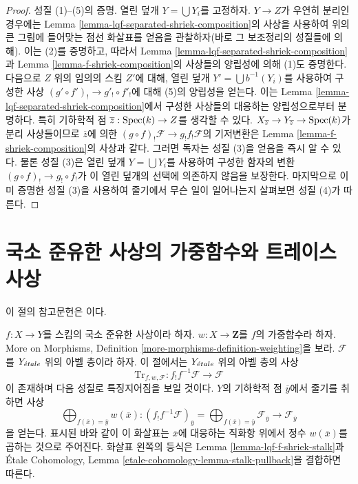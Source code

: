 \begin{proof}
\medskip\noindent
성질 (1)--(5)의 증명. 열린 덮개 $Y = \bigcup Y_i$를 고정하자.
$Y \to Z$가 우연히 분리인 경우에는 Lemma
\ref{lemma-lqf-separated-shriek-composition}의 사상을 사용하여 위의
큰 그림에 들어맞는 점선 화살표를 얻음을 관찰하자(바로 그 보조정리의
성질들에 의해). 이는 (2)를 증명하고, 따라서 Lemma
\ref{lemma-lqf-separated-shriek-composition}과 Lemma
\ref{lemma-f-shriek-composition}의 사상들의 양립성에 의해 (1)도
증명한다. 다음으로 $Z$ 위의 임의의 스킴 $Z'$에 대해, 열린 덮개
$Y' = \bigcup b^{-1}(Y_i)$를 사용하여 구성한 사상
$(g' \circ f')_! \to g'_! \circ f'_!$에 대해 (5)의 양립성을 얻는다.
이는 Lemma \ref{lemma-lqf-separated-shriek-composition}에서 구성한
사상들의 대응하는 양립성으로부터 분명하다. 특히 기하학적 점
$\overline{z} : \mathop{\mathrm{Spec}}(k) \to Z$를 생각할 수 있다.
$X_{\overline{z}} \to Y_{\overline{z}} \to \mathop{\mathrm{Spec}}(k)$가 분리 사상들이므로
$\overline{z}$에 의한
$(g \circ f)_!\mathcal{F} \to g_! f_! \mathcal{F}$의 기저변환은
Lemma \ref{lemma-f-shriek-composition}의 사상과 같다. 그러면 독자는
성질 (3)을 얻음을 즉시 알 수 있다. 물론 성질 (3)은 열린 덮개
$Y = \bigcup Y_i$를 사용하여 구성한 함자의 변환
$(g \circ f)_! \to g_! \circ f_!$가 이 열린 덮개의 선택에 의존하지
않음을 보장한다. 마지막으로 이미 증명한 성질 (3)을 사용하여 줄기에서
무슨 일이 일어나는지 살펴보면 성질 (4)가 따른다.
\end{proof}

\section{국소 준유한 사상의 가중함수와 트레이스 사상}
\label{section-weightings}

\noindent
이 절의 참고문헌은 \cite[Exposee XVII, Proposition 6.2.5]{SGA4}이다.

\medskip\noindent
$f : X \to Y$를 스킴의 국소 준유한 사상이라 하자.
$w : X \to \mathbf{Z}$를 $f$의 가중함수라 하자. More on Morphisms,
Definition \ref{more-morphisms-definition-weighting}을 보라.
$\mathcal{F}$를 $Y_{\acute{e}tale}$ 위의 아벨 층이라 하자. 이 절에서는
$Y_{\acute{e}tale}$ 위의 아벨 층의 사상
$$
\text{Tr}_{f, w, \mathcal{F}} :
f_!f^{-1}\mathcal{F}
\longrightarrow
\mathcal{F}
$$
이 존재하며 다음 성질로 특징지어짐을 보일 것이다. $Y$의 기하학적 점
$\overline{y}$에서 줄기를 취하면 사상
$$
\bigoplus\nolimits_{f(\overline{x}) = \overline{y}} w(\overline{x}) :
(f_!f^{-1}\mathcal{F})_{\overline{y}} =
\bigoplus\nolimits_{f(\overline{x}) = \overline{y}}
\mathcal{F}_{\overline{y}}
\longrightarrow
\mathcal{F}_{\overline{y}}
$$
을 얻는다. 표시된 바와 같이 이 화살표는 $\overline{x}$에 대응하는
직화항 위에서 정수 $w(\overline{x})$를 곱하는 것으로 주어진다.
화살표 왼쪽의 등식은 Lemma \ref{lemma-lqf-f-shriek-stalk}과
\'Etale Cohomology, Lemma
\ref{etale-cohomology-lemma-stalk-pullback}을 결합하면 따른다.


